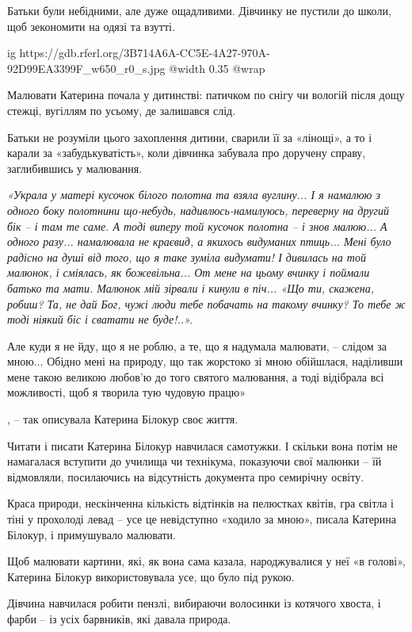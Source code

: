 Батьки були небідними, але дуже ощадливими. Дівчинку не пустили до школи, щоб
зекономити на одязі та взутті.

\ifcmt
  ig https://gdb.rferl.org/3B714A6A-CC5E-4A27-970A-92D99EA3399F_w650_r0_s.jpg
  @width 0.35
  @wrap 
\fi

Малювати Катерина почала у дитинстві: патичком по снігу чи вологій після дощу
стежці, вугіллям по усьому, де залишався слід.

Батьки не розуміли цього захоплення дитини, сварили її за «лінощі», а то і
карали за «забудькуватість», коли дівчинка забувала про доручену справу,
заглибившись у малювання.

{\em «Украла у матері кусочок білого полотна та взяла вуглину... І я намалюю з одного
боку полотнини що-небудь, надивлюсь-намилуюсь, переверну на другий бік – і там
те саме. А тоді виперу той кусочок полотна – і знов малюю... А одного разу...
намалювала не краєвид, а якихось видуманих птиць... Мені було радісно на душі від
того, що я таке зуміла видумати! І дивилась на той малюнок, і сміялась, як
божевільна... От мене на цьому вчинку і поймали батько та мати. Малюнок мій
зірвали і кинули в піч... «Що ти, скажена, робиш? Та, не дай Бог, чужі люди тебе
побачать на такому вчинку? То тебе ж тоді ніякий біс і сватати не буде!..».

Але куди я не йду, що я не роблю, а те, що я надумала малювати, – слідом за
мною... Обідно мені на природу, що так жорстоко зі мною обійшлася, наділивши мене
такою великою любов’ю до того святого малювання, а тоді відібрала всі
можливості, щоб я творила тую чудовую працю»}, – так описувала Катерина Білокур
своє життя.

Читати і писати Катерина Білокур навчилася самотужки. І скільки вона потім не
намагалася вступити до училища чи технікума, показуючи свої малюнки – їй
відмовляли, посилаючись на відсутність документа про семирічну освіту.


Краса природи, нескінченна кількість відтінків на пелюстках квітів, гра світла
і тіні у прохолоді левад – усе це невідступно «ходило за мною», писала Катерина
Білокур, і примушувало малювати.

Щоб малювати картини, які, як вона сама казала, народжувалися у неї «в голові»,
Катерина Білокур використовувала усе, що було під рукою.

Дівчина навчилася робити пензлі, вибираючи волосинки із котячого хвоста, і
фарби – із усіх барвників, які давала природа.

